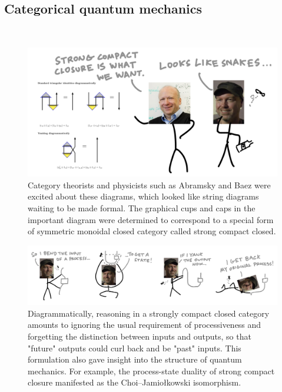 \subsection{Categorical quantum mechanics}\\

\begin{figure}[h!]
\includegraphics{figures/cartoons/samson}
\caption{Category theorists and physicists such as Abramsky and Baez were excited about these diagrams, which looked like string diagrams waiting to be made formal. The graphical cups and caps in the important diagram were determined to correspond to a special form of symmetric monoidal closed category called strong compact closed.}
\end{figure}

\begin{figure}[h!]
\includegraphics{figures/cartoons/cjiso}
\caption{Diagrammatically, reasoning in a strongly compact closed category amounts to ignoring the usual requirement of processiveness and forgetting the distinction between inputs and outputs, so that "future" outputs could curl back and be "past" inputs. This formulation also gave insight into the structure of quantum mechanics. For example, the process-state duality of strong compact closure manifested as the Choi–Jamiołkowski isomorphism.}
\end{figure}

